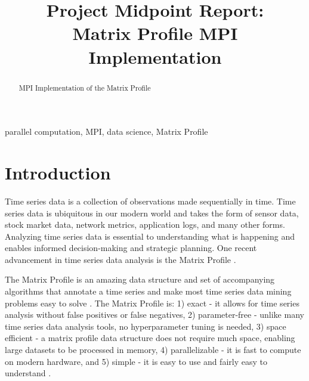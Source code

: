 \documentclass[conference]{IEEEtran}
\begin{document}
\title{Project Midpoint Report:\\Matrix Profile MPI Implementation}

\author{
}


\maketitle
\begin{abstract}
MPI Implementation of the Matrix Profile
\end{abstract}

\begin{IEEEkeywords}
parallel computation, MPI, data science, Matrix Profile
\end{IEEEkeywords}

\section{Introduction}
Time series data is a collection of observations made sequentially in time.  Time series data is ubiquitous in our modern world and takes the form of sensor data, stock market data, network metrics, application logs, and many other forms.  Analyzing time series data is essential to understanding what is happening and enables informed decision-making and strategic planning.  One recent advancement in time series data analysis is the Matrix Profile \cite{MatrixProfile1}. 

The Matrix Profile is an amazing data structure and set of accompanying algorithms that annotate a time series and make most time series data mining problems easy to solve \cite{MatrixProfile2}. The Matrix Profile is:  1) exact - it allows for time series analysis without false positives or false negatives, 2) parameter-free - unlike many time series data analysis tools, no hyperparameter tuning is needed, 3) space efficient - a matrix profile data structure does not require much space, enabling large datasets to be processed in memory, 4) parallelizable - it is fast to compute on modern hardware, and 5) simple - it is easy to use and fairly easy to understand \cite{Keogh}.   
\end{document}

